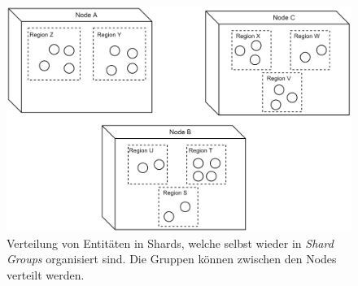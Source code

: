 \begin{figure}
  \centering
  \includegraphics[width=0.8\linewidth]{gfx/implementation/Sharding}
  \caption{Verteilung von Entitäten in Shards, welche selbst wieder in \textit{Shard Groups} organisiert sind. Die Gruppen können zwischen den Nodes verteilt werden. }
  \label{fig:implementation:actorSharding}
\end{figure} 

